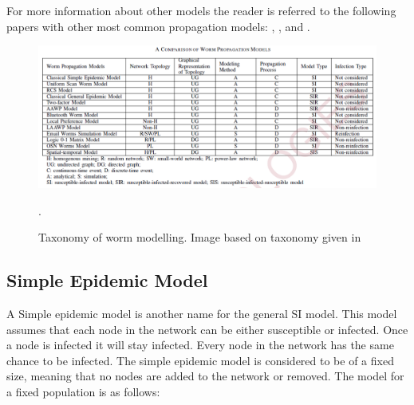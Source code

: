 
For more information about other models the reader is referred to the following papers with other most common propagation models: \cite{wang2014modeling}, \cite{OnWorms2005survey}, \cite{xiang2009propagation} and \cite{serazzi2004computer}.



\begin{figure}
\centering
\includegraphics[scale=0.55]{Images/tableworms.png}
\caption{Taxonomy of worm modelling. Image based on taxonomy given in \cite{wang2014modeling}}.
\label{tree}
\end{figure}


\subsection{Simple Epidemic Model}
A Simple epidemic model is another name for the general SI model. This model assumes that each node in the network can be either susceptible or infected. 
Once a node is infected it will stay infected. Every node in the network has the same chance to be infected. 
The simple epidemic model is considered to be of a fixed size, meaning that no nodes are added to the network or removed. The model for a fixed population is as follows:

